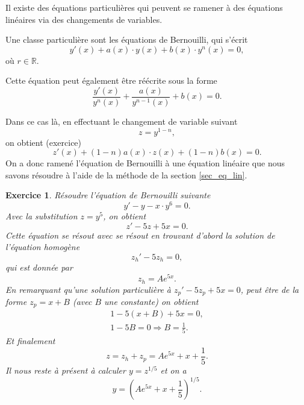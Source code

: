 \documentclass[a4paper,12pt]{book}
\newcommand{\real}{\mathbb{R}}
\newtheorem*{exercice}{Exercice}
\begin{document}
Il existe des équations particulières qui peuvent se ramener à des équations linéaires via des changements de variables.

Une classe particulière sont les équations de Bernouilli, qui s'écrit
\begin{equation}
 y'(x)+a(x)\cdot y(x)+b(x)\cdot y^n(x)=0,\label{eq_bernouilli}
\end{equation}
où $r\in\real$.

Cette équation peut également être réécrite sous la forme
\begin{equation}
 \frac{y'(x)}{y^n(x)}+\frac{a(x)}{y^{n-1}(x)}+b(x)=0.\label{eq_bernouilli_2}
\end{equation}

Dans ce cas là, en effectuant le changement de variable suivant
\begin{equation}
 z=y^{1-n},
\end{equation}
on obtient (exercice)
\begin{equation}
z'(x)+(1-n)a(x)\cdot z(x)+(1-n)b(x)=0.
\end{equation}
On a donc ramené l'équation de Bernouilli à une équation linéaire que nous savons résoudre à l'aide de la méthode de la section \ref{sec_eq_lin}.

\begin{exercice}
 Résoudre l'équation de Bernouilli suivante
 \begin{equation}
  y'-y-x\cdot y^6=0.
 \end{equation}
Avec la substitution $z=y^5$, on obtient
\begin{equation}
 z'-5z+5x=0.
\end{equation}
Cette équation se résout avec se résout en trouvant d'abord la solution de l'équation homogène
\begin{equation}
 z_h'-5z_h=0,
\end{equation}
qui est donnée par
\begin{equation}
 z_h=Ae^{5x}.
\end{equation}
En remarquant qu'une solution particulière à $z_p'-5z_p+5x=0$, peut être de la forme $z_p=x+B$ (avec $B$ une constante)
on obtient
\begin{align}
 1-5(x+B)+5x=0,\nonumber\\
 1-5B=0\Rightarrow B=\frac{1}{5}.
\end{align}
Et finalement 
\begin{equation}
 z=z_h+z_p=Ae^{5x}+x+\frac{1}{5}.
\end{equation}
Il nous reste à présent à calculer $y=z^{1/5}$ et on a
\begin{equation}
 y=\left(Ae^{5x}+x+\frac{1}{5}\right)^{1/5}.
\end{equation}

\end{exercice}
\end{document}
